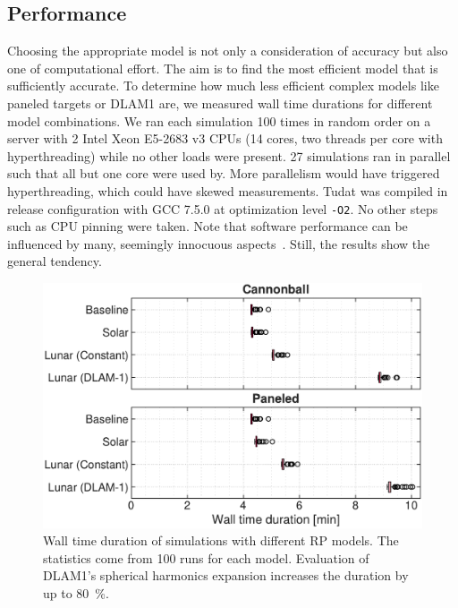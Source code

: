 \subsection{Performance}
Choosing the appropriate model is not only a consideration of accuracy but also one of computational effort. The aim is to find the most efficient model that is sufficiently accurate. To determine how much less efficient complex models like paneled targets or \gls{DLAM1} are, we measured wall time durations for different model combinations. We ran each simulation 100 times in random order on a server with 2 Intel Xeon E5-2683 v3 CPUs (14 cores, two threads per core with hyperthreading) while no other loads were present. 27 simulations ran in parallel such that all but one core were used by. More parallelism would have triggered hyperthreading, which could have skewed measurements. \gls{Tudat} was compiled in release configuration with GCC 7.5.0 at optimization level \texttt{-O2}. No other steps such as CPU pinning were taken. Note that software performance can be influenced by many, seemingly innocuous aspects~\cite{Mytkowicz2009}. Still, the results show the general tendency.

\begin{figure}[b]
    \centering
    \includegraphics[width=\linewidth]{figures/plots/performance.pdf}
    \caption{Wall time duration of simulations with different \gls{RP} models. The statistics come from 100 runs for each model. Evaluation of \gls{DLAM1}'s spherical harmonics expansion increases the duration by up to \qty{80}{\percent}.}
    \label{fig:performance}
\end{figure}

